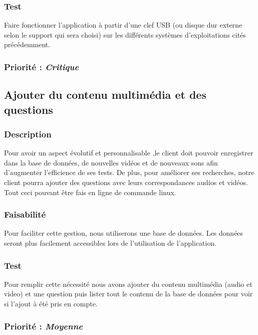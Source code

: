 \subsubsection{Test}

Faire fonctionner l’application à partir d’une clef USB (ou disque dur externe selon le support qui sera choisi) sur les différents systèmes d’exploitations cités précédemment.

\subsubsection{Priorité : \textit{Critique}}

\subsection{Ajouter du contenu multimédia et des questions}

\subsubsection{Description}
Pour avoir un aspect évolutif et personnalisable ,le client doit pouvoir enregistrer dans la base de données, de nouvelles vidéos et de nouveaux sons afin d’augmenter l’efficience de ses tests. De plus, pour améliorer ses recherches, notre client pourra ajouter des questions avec leurs correspondances audios et vidéos.
Tout ceci pouvant être fais en ligne de commande linux.

\subsubsection{Faisabilité}

Pour faciliter cette gestion, nous utiliserons une base de données. Les données seront plus facilement accessibles lors de l’utilisation de l’application.

\subsubsection{Test}

Pour remplir cette nécessité nous avons ajouter du contenu multimédia (audio et video) et une question puis lister tout le contenu de la base de données pour voir si l’ajout à été pris en compte.

\subsubsection{Priorité : \textit{Moyenne}}

